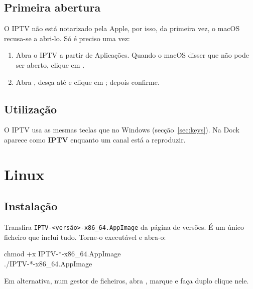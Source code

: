 \subsection{Primeira abertura}
O IPTV não está notarizado pela Apple, por isso, da primeira vez, o macOS
recusa-se a abri-lo. Só é preciso uma vez:
\begin{enumerate}
  \item Abra o IPTV a partir de Aplicações. Quando o macOS disser que não pode
        ser aberto, clique em .
  \item Abra , desça até  e clique em
        ; depois confirme.
\end{enumerate}

\subsection{Utilização}
O IPTV usa as mesmas teclas que no Windows (secção~\ref{sec:keys}). Na Dock
aparece como \textbf{IPTV} enquanto um canal está a reproduzir.


\section{Linux}

\subsection{Instalação}
Transfira \texttt{IPTV-\textless versão\textgreater-x86\_64.AppImage} da
página de versões. É um único ficheiro que inclui tudo. Torne-o executável e
abra-o:
\begin{center}
\begin{minipage}{0.8\linewidth}
\small\ttfamily chmod +x IPTV-*-x86\_64.AppImage\\
./IPTV-*-x86\_64.AppImage
\end{minipage}
\end{center}
Em alternativa, num gestor de ficheiros, abra , marque  e faça duplo clique nele.

